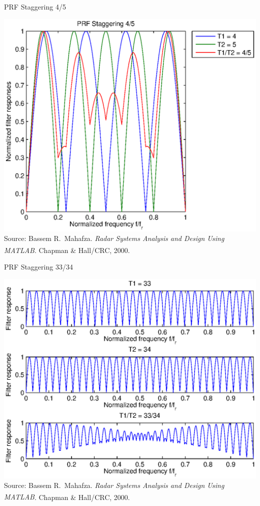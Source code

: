 \documentclass[mathserif]{beamer}
\begin{document}
    
    \begin{frame}{PRF Staggering 4/5}
      \begin{minipage}[t][0.8\textheight][t]{\textwidth}
	\centering
	\includegraphics[width=0.8\linewidth]{prfStaggering4_5} \\
	\vfill
	\tiny{Source: Bassem R.~Mahafza. \emph{Radar Systems Analysis and Design Using MATLAB\textsuperscript{\textregistered}}. Chapman \& Hall/CRC, 2000.}
      \end{minipage}
    \end{frame}
    
    
    \begin{frame}{PRF Staggering 33/34}
      \begin{minipage}[t][0.8\textheight][t]{\textwidth}
	\includegraphics[width=\linewidth]{prfStaggering33_34} \\
	\vfill
	\tiny{Source: Bassem R.~Mahafza. \emph{Radar Systems Analysis and Design Using MATLAB\textsuperscript{\textregistered}}. Chapman \& Hall/CRC, 2000.}
      \end{minipage}
    \end{frame}
    
\end{document}
